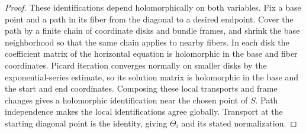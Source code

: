 \begin{proof}
These identifications depend holomorphically on both variables. Fix a
base point and a path in its fiber from the diagonal to a desired endpoint.
Cover the path by a finite chain of coordinate disks and bundle frames,
and shrink the base neighborhood so that the same chain applies to nearby
fibers. In each disk the coefficient matrix of the horizontal equation
is holomorphic in the base and fiber coordinates. Picard iteration
converges normally on smaller disks by the exponential-series estimate,
so its solution matrix is holomorphic in the base and the start and end
coordinates. Composing these local transports and frame changes gives a
holomorphic identification near the chosen point of \(S\). Path
independence makes the local identifications agree globally. Transport
at the starting diagonal point is the identity, giving \(\Theta_i\)
and its stated normalization.
\end{proof}
